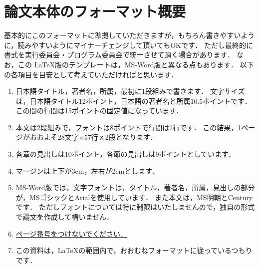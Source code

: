 \section{論文本体のフォーマット概要}

基本的にこのフォーマットに準拠していただきますが，もちろん書きやすいように，読みやすいようにマイナーチェンジして頂いてもOKです．
ただし最終的に書式を実行委員会・プログラム委員会で統一させて頂く場合があります．
なお，この \LaTeX 版のテンプレートは，MS-Word版と異なる点もあります．
以下の各項目を目安として考えていただければと思います．

\begin{enumerate}
\item 日本語タイトル，著者名，所属，最初に1段組みで書きます．
文字サイズは，日本語タイトル12ポイント，日本語の著者名と所属10.5ポイントです．
この間の行間は15ポイントの固定値になっています．

\item 本文は2段組みで，フォントは8ポイントで行間は1行です．
この結果，1ページがおおよそ28文字×57行ｘ2段となります．

\item 各章の見出しは10ポイント，各節の見出しは9ポイントとしています．

\item マージンは上下が3cm，左右が2cmとします．

\item MS-Word版では，文字フォントは，タイトル，著者名，所属，見出しの部分が，MSゴシックとArialを使用しています．
また本文は，MS明朝とCenturyです．
ただしフォントについては特に制限はいたしませんので，独自の形式で論文を作成して構いません．

\item \underline{ページ番号をつけないでください．}

\item この資料は，\LaTeX の範囲内で，おおむねフォーマットに従っているつもりです．
\end{enumerate}